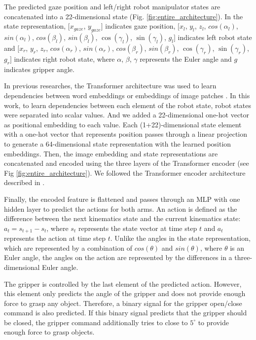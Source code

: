 \documentclass[letterpaper, 10 pt, conference]{ieeeconf}  %
\renewcommand\hl[1]{#1} %
\begin{document}
The predicted gaze position and left/right robot manipulator states are concatenated into a 22-dimensional state \hl{(Fig. }\ref{fig:entire_architecture}).
\hl{In the state representation, $[$$x_{gaze}$, $y_{gaze}$$]$ indicates gaze position, $[$$x_l$, $y_l$, $z_l$, $cos(\alpha_l)$, $sin(\alpha_l)$, $cos(\beta_l)$, $sin(\beta_l)$, $\cos(\gamma_l)$, $\sin(\gamma_l)$, $g_l$$]$ indicates left robot state and $[$$x_r$, $y_r$, $z_r$, $cos(\alpha_r)$, $sin(\alpha_r)$, $cos(\beta_r)$, $sin(\beta_r)$, $\cos(\gamma_r)$, $\sin(\gamma_r)$, $g_r$$]$ indicates right robot state, where $\alpha$, $\beta$, $\gamma$ represents the Euler angle and $g$ indicates gripper angle.}

In previous researches, the Transformer architecture was used to learn dependencies between word embeddings or embeddings of image patches \cite{vaswani2017attention,dosovitskiy2020image}. 
In this work, to learn dependencies between each element of the robot state, robot states were separated into scalar values. \hl{And we added a 22-dimensional one-hot vector as positional embedding to each value.}
Each \hl{(1+22)}-dimensional state element with a one-hot vector that represents position passes through a linear projection to generate a 64-dimensional state representation with the learned position embeddings. Then, the image embedding and state representations are concatenated and encoded using the three layers of the Transformer encoder \hl{(see Fig }\ref{fig:entire_architecture}). We followed the Transformer encoder architecture described in \cite{vaswani2017attention}.

Finally, the encoded feature is flattened and passes through an MLP with one hidden \hl{layer} to predict the actions for both arms. An action is defined as the difference between the next kinematics state and the current kinematics state: $a_t = s_{t+1} - s_t$, where $s_t$ represents the state vector at time step $t$ and $a_t$ represents the action at time step $t$. Unlike the angles in the state representation, which are represented by a combination of $cos(\theta)$ and $sin(\theta)$, where $\theta$ is an Euler angle, the angles on the action are represented by the differences in a three-dimensional Euler angle.

The gripper is controlled by the last element of the predicted action. However, this element only predicts the angle of the gripper and does not provide enough force to grasp any object. Therefore, a binary signal for the gripper open/close command is also predicted. If this binary signal predicts that the gripper should be closed, the gripper command additionally tries to close to $5^\circ$ to provide enough force to grasp objects. 
\end{document}
